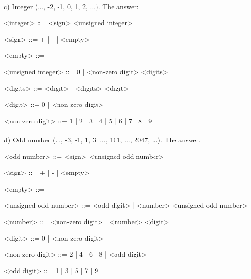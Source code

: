 \documentclass{article}
\begin{document}
	\paragraph{}
	\rmfamily
	
		c) Integer (..., -2, -1, 0, 1, 2, ...). The answer:
			
	\ttfamily
	\begin{grammar}
		
		<integer> ::= <sign> <unsigned integer>
		
		<sign> ::= + | - | <empty>
		
		<empty> ::= \
		
		<unsigned integer> ::= 0 | <non-zero digit> <digits>
				
		<digits> ::= <digit> | <digits> <digit>

		<digit> ::= 0 | <non-zero digit>
		
		<non-zero digit> ::= 1 | 2 | 3 | 4 | 5 | 6 | 7 | 8 | 9

		
	\end{grammar}




	\paragraph{}
	\rmfamily
	
		d) Odd number (..., -3, -1, 1, 3, ..., 101, ..., 2047, ...). The answer:
			
	\ttfamily
	\begin{grammar}
	
		<odd number> ::= <sign> <unsigned odd number>
		
		<sign> ::= + | - | <empty>
		
		<empty> ::= \
		
		<unsigned odd number> ::= <odd digit> | <number> <unsigned odd number>
		
		<number> ::= <non-zero digit> | <number> <digit>
		
		<digit> ::= 0 | <non-zero digit>
		
		<non-zero digit> ::= 2 | 4 | 6 | 8 | <odd digit>
		
		<odd digit> ::= 1 | 3 | 5 | 7 | 9
		
	\end{grammar}
	
	
	
	
	\paragraph{}
	\rmfamily
	
\end{document}
